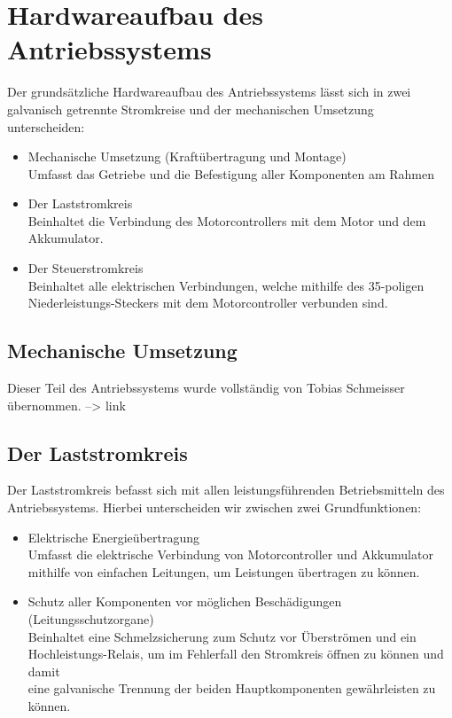 \section{Hardwareaufbau des Antriebssystems}
Der grundsätzliche Hardwareaufbau des Antriebssystems lässt sich in zwei galvanisch getrennte Stromkreise und der mechanischen Umsetzung unterscheiden:

\begin{itemize}
	\item Mechanische Umsetzung (Kraftübertragung und Montage) 
	\\ Umfasst das Getriebe und die Befestigung aller Komponenten am Rahmen
	\item Der Laststromkreis
	\\ Beinhaltet die Verbindung des Motorcontrollers mit dem Motor und dem Akkumulator.
	\item Der Steuerstromkreis
	\\ Beinhaltet alle elektrischen Verbindungen, welche mithilfe des 35-poligen
	\\ Niederleistungs-Steckers mit dem Motorcontroller verbunden sind.
\end{itemize}

\newpage



\subsection{Mechanische Umsetzung}
Dieser Teil des Antriebssystems wurde vollständig von Tobias Schmeisser übernommen.
--> link

\newpage



\subsection{Der Laststromkreis}
Der Laststromkreis befasst sich mit allen leistungsführenden Betriebsmitteln des Antriebssystems. Hierbei unterscheiden wir zwischen zwei Grundfunktionen:

\begin{itemize}
	\item Elektrische Energieübertragung
	\\ Umfasst die elektrische Verbindung von Motorcontroller und Akkumulator 					\\ mithilfe von einfachen Leitungen, um Leistungen übertragen zu können.
	\item Schutz aller Komponenten vor möglichen Beschädigungen (Leitungsschutzorgane)
	\\ Beinhaltet eine Schmelzsicherung zum Schutz vor Überströmen und ein 						\\ Hochleistungs-Relais, um im Fehlerfall den Stromkreis öffnen zu können und damit  		\\ eine galvanische Trennung der beiden Hauptkomponenten gewährleisten zu können.
\end{itemize}

